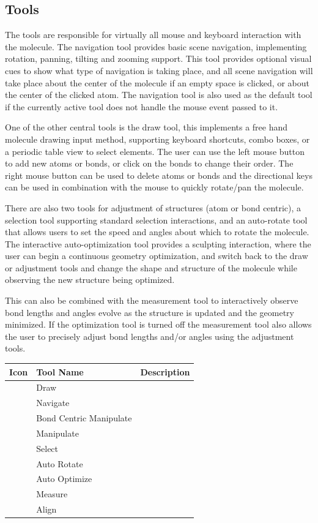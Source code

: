 \documentclass[10pt]{bmc_article}
\newenvironment{bmcformat}{\begin{raggedright}
\baselineskip20pt\sloppy\setboolean{publ}{false}}{\end{raggedright}
\baselineskip20pt\sloppy}
\begin{document}
\begin{bmcformat}
\subsection{Tools}

The tools are responsible for virtually all mouse and keyboard interaction with
the molecule. The navigation tool provides basic scene navigation, implementing
rotation, panning, tilting and zooming support. This tool provides optional
visual cues to show what type of navigation is taking place, and all scene
navigation will take place about the center of the molecule if an empty space is
clicked, or about the center of the clicked atom. The navigation tool is also
used as the default tool if the currently active tool does not handle the mouse
event passed to it.

One of the other central tools is the draw tool, this implements a free hand
molecule drawing input method, supporting keyboard shortcuts, combo boxes, or a
periodic table view to select elements. The user can use the left mouse button
to add new atoms or bonds, or click on the bonds to change their order. The
right mouse button can be used to delete atoms or bonds and the directional keys
can be used in combination with the mouse to quickly rotate/pan the molecule.

There are also two tools for adjustment of structures (atom or bond centric), a
selection tool supporting standard selection interactions, and an auto-rotate
tool that allows users to set the speed and angles about which to rotate the
molecule. The interactive auto-optimization tool provides a sculpting
interaction, where the user can begin a continuous geometry optimization, and
switch back to the draw or adjustment tools and change the shape and structure
of the molecule while observing the new structure being optimized.

This can also be combined with the measurement tool to interactively observe
bond lengths and angles evolve as the structure is updated and the geometry
minimized. If the optimization tool is turned off the measurement tool also
allows the user to precisely adjust bond lengths and/or angles using the
adjustment tools.

\begin{tabular}{c | l | l }
\hline
Icon & Tool Name & Description \\
\hline
& Draw & \\
& Navigate & \\
& Bond Centric Manipulate & \\
& Manipulate & \\
& Select & \\
& Auto Rotate & \\
& Auto Optimize & \\
& Measure & \\
& Align & \\
\hline
\end{tabular}


\end{bmcformat}
\end{document}
